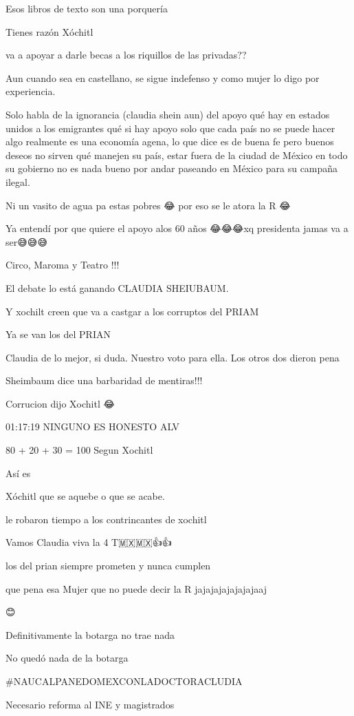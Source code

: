 Esos libros de texto son una porquería

Tienes razón  Xóchitl

va a apoyar a darle becas a los riquillos de las privadas??

Aun cuando sea en castellano, se sigue indefenso y como mujer lo digo por experiencia.

Solo habla de la ignorancia (claudia shein aun) del apoyo qué hay en estados unidos a los emigrantes qué si hay apoyo solo que cada país no se puede hacer algo realmente es una economía agena, lo que dice es de buena fe pero buenos deseos no sirven qué manejen su país, estar fuera de la ciudad de México en todo su gobierno no es nada bueno por andar paseando en México para su campaña ilegal.

Ni un vasito de agua pa estas pobres 😂 por eso se le atora la R 😂

Ya entendí por que  quiere  el apoyo alos 60 años 😂😂😂xq presidenta jamas va a ser😅😅😅

Circo, Maroma y Teatro !!!

El debate lo está ganando CLAUDIA SHEIUBAUM.

Y xochilt creen que va a castgar a los corruptos del PRIAM

Ya se van los del PRIAN

Claudia de lo mejor, si  duda. Nuestro voto para ella. Los otros dos dieron pena

Sheimbaum dice una barbaridad de mentiras!!! 🤨

Corrucion dijo Xochitl 😂

01:17:19 NINGUNO ES HONESTO ALV

80 + 20  + 30  = 100
Segun Xochitl

Así es 🎉

Xóchitl que se aquebe o que se acabe.

le robaron tiempo a los contrincantes de xochitl

Vamos Claudia viva la 4 T🇲🇽🇲🇽👍👍

los del prian siempre prometen y nunca cumplen

que pena esa Mujer que no puede decir la R jajajajajajajajaaj

😊

Definitivamente la botarga no trae nada

No quedó nada de la botarga

#NAUCALPANEDOMEXCONLADOCTORACLUDIA

Necesario reforma al INE y magistrados

